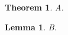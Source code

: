 \documentclass{article}
\newtheorem{theorem}{Theorem}
\newtheorem{lemma}[thmlemma]{Lemma}
\begin{document}
\begin{theorem}A.\end{theorem}
\begin{lemma}B.\end{lemma}
\end{document}

